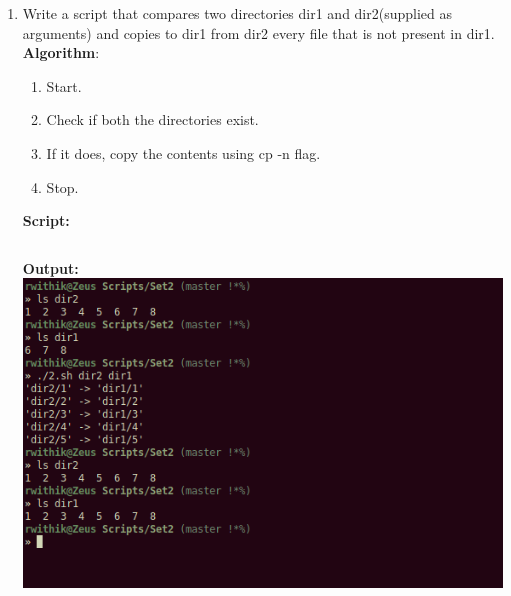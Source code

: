 \documentclass[10pt,a4paper,titlepage]{report}
\begin{document}
\begin{enumerate}
\item Write a script that compares two directories dir1 and dir2(supplied as arguments) and copies to dir1 from dir2 every file that is not present in dir1. \newline
\textbf{Algorithm}:\newline
\begin{enumerate}
	\item Start.
	\item Check if both the directories exist.
	\item If it does, copy the contents using {\color{red}cp -n} flag.
	\item Stop.
\end{enumerate}
\newline
\textbf{Script:}\newline
\inputminted{bash}{../Scripts/Set2/2.sh}
\newline
\textbf{Output:}\newline
\includegraphics[width=\linewidth]{../Images/Shell2/2.png}
\pagebreak


\end{enumerate}
\end{document}
